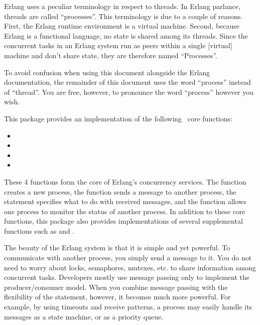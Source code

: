 \documentclass{howto}
\newcommand{\Erlang}{\ulink{Erlang}{http://www.erlang.org/}}
\begin{document}
\begin{notice}[note]
Erlang uses a peculiar terminology in respect to threads. In Erlang parlance,
threads are called ``processes''. This terminology is due to a couple of
reasons. First, the Erlang runtime environment is a virtual machine. Second,
because Erlang is a functional language, no state is shared among its threads.
Since the concurrent tasks in an Erlang system run as peers within a single
[virtual] machine and don't share state, they are therefore named ``Processes''.

To avoid confusion when using this document alongside the Erlang documentation,
the remainder of this document uses the word ``process'' instead of ``thread''.
You are free, however, to pronounce the word ``process'' however you wish.
\end{notice}

This package provides an implementation of the following \Erlang\ core
functions:
\begin{itemize}
	\item {}
	\item {}
	\item {}
	\item {}
\end{itemize}

These 4 functions form the core of Erlang's concurrency services. The
 function creates a new process, the 
function sends a message to another process, the  statement
specifies what to do with received messages, and the  function
allows one process to monitor the status of another process. In addition to
these core functions, this package also provides implementations of several
supplemental functions such as  and .

The beauty of the Erlang system is that it is simple and yet powerful. To
communicate with another process, you simply send a message to it. You do not
need to worry about locks, semaphores, mutexes, etc. to share information among
concurrent tasks. Developers mostly use message passing only to implement the
producer/consumer model. When you combine message passing with the flexibility
of the  statement, however, it becomes much more powerful. For
example, by using timeouts and receive patterns, a process may easily handle its
messages as a state machine, or as a priority queue.
\end{document}
